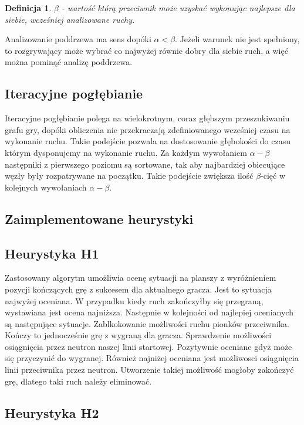 \documentclass[a4paper,12pt]{article}
\newtheorem{df}{Definicja}
\begin{document}
\begin{df}
	$\beta$ - wartość którą przeciwnik może uzyskać wykonując najlepsze dla siebie, wcześniej analizowane ruchy.
\end{df}

Analizowanie poddrzewa ma sens dopóki $\alpha < \beta$. Jeżeli warunek nie jest spełniony, to
rozgrywający może wybrać co najwyżej równie dobry dla siebie ruch, a więć można pominąć analizę poddrzewa.

\subsection{Iteracyjne pogłębianie}

Iteracyjne pogłębianie polega na wielokrotnym, coraz głębszym przeszukiwaniu grafu gry, dopóki obliczenia
nie przekraczają zdefiniowanego wcześniej czasu na wykonanie ruchu. Takie podejście pozwala na dostosowanie głębokości do czasu którym dysponujemy na wykonanie ruchu. Za każdym wywołaniem $\alpha-\beta$ następniki z pierwszego poziomu są sortowane, tak aby najbardziej obiecujące węzły były rozpatrywane na początku. Takie podejście zwiększa ilość $\beta$-cięć w kolejnych wywołaniach $\alpha-\beta$.

\subsection{Zaimplementowane heurystyki}

\subsection{Heurystyka H1}

Zastosowany algorytm umożliwia ocenę sytuacji na planszy z wyróżnieniem pozycji kończących grę z sukcesem dla aktualnego gracza. Jest to sytuacja najwyżej oceniana. W przypadku kiedy ruch zakończyłby się przegraną, wystawiana jest ocena najniższa. Następnie w kolejności od najlepiej ocenianych są następujące sytuacje. Zablkokowanie możliwości ruchu pionków przeciwnika. Kończy to jednocześnie grę z wygraną dla gracza. Sprawdzenie możliwości osiągnięcia przez neutron naszej linii startowej. Pozytywnie oceniane gdyż może się przyczynić do wygranej. Również najniżej oceniana jest możliwosci osiągnięcia linii przeciwnika przez neutron. Utworzenie takiej możliwość mogłoby zakończyć grę, dlatego taki ruch należy eliminować.

\subsection{Heurystyka H2}
\end{document}

